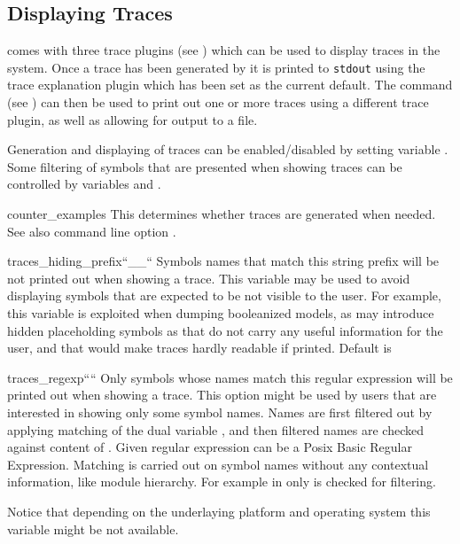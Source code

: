 



\subsection{Displaying Traces}
\label{Displaying Traces}
%
\nusmv comes with three trace plugins (see ) which
can be used to display traces in the system. Once a trace has been
generated by \nusmv it is printed to \texttt{stdout} using the trace
explanation plugin which has been set as the current default. The
command  (see ) can
then be used to print out one or more traces using a different trace
plugin, as well as allowing for output to a file.

Generation and displaying of traces can be enabled/disabled by
setting variable . Some filtering of
symbols that are presented when showing traces can be controlled
by variables  and
.

\begin{nusmvVar} {counter\_examples}{}{}
This determines whether traces are generated when needed. See also
command line option .
\end{nusmvVar}

\begin{nusmvVar} {traces\_hiding\_prefix}{}{``\_\_``}
Symbols names that match this string prefix will be not printed
out when showing a trace. This variable may be used to avoid
displaying symbols that are expected to be not visible to the
user. For example, this variable is exploited when dumping
booleanized models, as \nusmv may introduce hidden placeholding
symbols as  that do not carry any useful information
for the user, and that would make traces hardly readable if
printed. Default is \code{\_\_}
\end{nusmvVar}

\begin{nusmvVar} {traces\_regexp}{}{````}
Only symbols whose names match this regular expression will be
printed out when showing a trace. This option might be used by
users that are interested in showing only some symbol names. Names
are first filtered out by applying matching of the dual
variable , and then
filtered names are checked against content
of . Given regular expression
can be a Posix Basic Regular Expression. Matching is carried out
on symbol names without any contextual information, like module
hierarchy. For example in  only  is
checked for filtering.

Notice that depending on the underlaying platform and operating
system this variable might be not available.
\end{nusmvVar}

